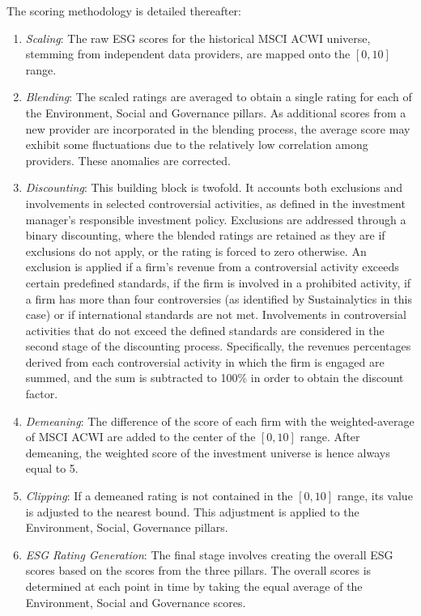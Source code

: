 \documentclass[11pt,a4paper]{article}
\begin{document}
\begin{center}
    
    \label{tab:esg_data_provider}
\end{center}

The scoring methodology is detailed thereafter:
	
\begin{enumerate}
    \item \textit{Scaling}: The raw ESG scores for the historical MSCI ACWI universe, stemming from independent data providers, are mapped onto the $[0,10]$ range.
    \item \textit{Blending}: The scaled ratings are averaged to obtain a single rating for each of the Environment, Social and Governance pillars. As additional scores from a new provider are incorporated in the blending process, the average score may exhibit some fluctuations due to the relatively low correlation among providers. These anomalies are corrected. 
    \item \textit{Discounting}: This building block is twofold. It accounts both exclusions and involvements in selected controversial activities, as defined in the investment manager's responsible investment policy. Exclusions are addressed through a binary discounting, where the blended ratings are retained as they are if exclusions do not apply, or the rating is forced to zero otherwise. An exclusion is applied if a firm's revenue from a controversial activity exceeds certain predefined standards, if the firm is involved in a prohibited activity, if a firm has more than four controversies (as identified by Sustainalytics in this case) or if international standards are not met. Involvements in controversial activities that do not exceed the defined standards are considered in the second stage of the discounting process. Specifically, the revenues percentages derived from each controversial activity in which the firm is engaged are summed, and the sum is subtracted to 100\% in order to obtain the discount factor.
	\item \textit{Demeaning}: The difference of the score of each firm with the weighted-average of MSCI ACWI are added to the center of the $[0,10]$ range. After demeaning, the weighted score of the investment universe is hence always equal to 5. 
	\item \textit{Clipping}: If a demeaned rating is not contained in the $[0,10]$ range, its value is adjusted to the nearest bound. This adjustment is applied to the Environment, Social, Governance pillars.
    \item \textit{ESG Rating Generation}: The final stage involves creating the overall ESG scores based on the scores from the three pillars. The overall scores is determined at each point in time by taking the equal average of the Environment, Social and Governance scores.
\end{enumerate}
\end{document}
